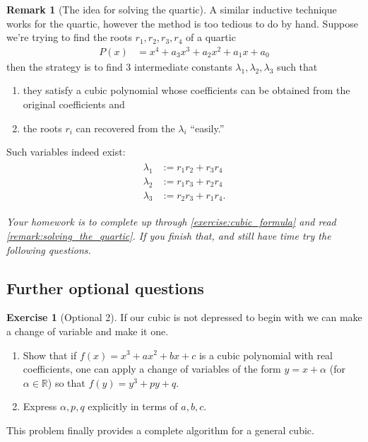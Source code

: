 \documentclass[reqno, 12pt, letter]{article}
\theoremstyle{plain}
\theoremstyle{definition}
\newtheorem{remark}[theorem]{Remark}
\newtheorem{exercise}[theorem]{Exercise}
\theoremstyle{remark}
\numberwithin{equation}{section}
\newcommand\br{{\mathbb R}}
\begin{document}
\begin{remark}[The idea for solving the quartic]
	\label{remark:solving_the_quartic}
	A similar inductive technique works for the quartic, however the method is too tedious to do by hand. Suppose we're trying to find the roots $ r_1, r_2, r_3, r_4$ of a quartic \begin{align*}
		P(x) & = x^4 + a_3x^3 + a_2x^2 + a_1x + a_0
	\end{align*}
	then the strategy is to find 3 {intermediate constants} $ \lambda_1, \lambda_2, \lambda_3$ such that
	\begin{enumerate}
		\item they satisfy a cubic polynomial whose coefficients can be obtained from the original coefficients and
		\item the roots $r_i$ can recovered from the $ \lambda_i$ ``easily.''		\end{enumerate}
	Such variables indeed exist:
	\begin{align}
		\label{equation:intermediate_variables_quartic}
		\begin{split}
			\lambda_1 &:= r_1 r_2 + r_3 r_4 \\
			\lambda_2 &:= r_1 r_3 + r_2 r_4 \\
			\lambda_3 &:= r_2 r_3 + r_1 r_4.
		\end{split}
	\end{align}

	{\it Your homework is to complete up through \autoref{exercise:cubic_formula} and read \autoref{remark:solving_the_quartic}. If you finish that, and still have time try the following questions.}
	\subsection{Further optional questions}

	\begin{exercise}[Optional 2]
		If our cubic is not depressed to begin with we can make a change of variable and make it one.
		\begin{enumerate}
			\item Show that if $f(x) = x^3 + ax^2 +bx +c$ is a cubic polynomial with real coefficients, one can apply a change of variables of the form $y = x + \alpha$ (for $\alpha \in \br$) so that $f(y) = y^3 + py + q$.
			\item Express $\alpha, p, q$ explicitly in terms of $a,b,c$.
		\end{enumerate}
		This problem finally provides a complete algorithm for a general cubic.
	\end{exercise}


\end{remark}
\end{document}
